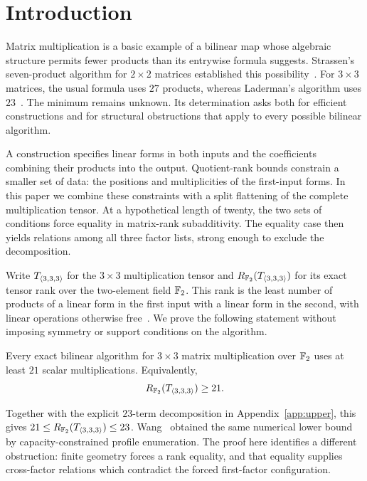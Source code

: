 \section{Introduction}\label{sec:introduction}

Matrix multiplication is a basic example of a bilinear map whose
algebraic structure permits fewer products than its entrywise formula
suggests. Strassen's seven-product algorithm for $2\times2$ matrices
established this possibility~\cite{strassen}. For $3\times3$ matrices,
the usual formula uses $27$ products, whereas Laderman's algorithm uses
$23$~\cite{laderman}. The minimum remains unknown. Its determination
asks both for efficient constructions and for structural obstructions
that apply to every possible bilinear algorithm.

A construction specifies linear forms in both inputs and the
coefficients combining their products into the output. Quotient-rank
bounds constrain a smaller set of data: the positions and
multiplicities of the first-input forms. In this paper we combine
these constraints with a split flattening of the complete
multiplication tensor. At a hypothetical length of twenty, the two
sets of conditions force equality in matrix-rank subadditivity.
The equality case then yields relations among all three factor lists,
strong enough to exclude the decomposition.

Write $T_{\langle3,3,3\rangle}$ for the $3\times3$ multiplication tensor and
$R_{\mathbb F_2}(T_{\langle3,3,3\rangle})$ for its exact tensor rank over the two-element field $\mathbb F_2$.
This rank is the least number of products of a linear form in the first
input with a linear form in the second, with linear operations otherwise
free~\cite{bcs}. We prove the following statement without imposing symmetry or
support conditions on the algorithm.

\begin{theorem}\label{thm:main}
Every exact bilinear algorithm for $3\times3$ matrix multiplication over
$\mathbb F_2$ uses at least $21$ scalar multiplications. Equivalently,
\begin{equation}\label{eq:main-bound}
 R_{\mathbb F_2}(T_{\langle3,3,3\rangle})\geq21.
\end{equation}
\end{theorem}

Together with the explicit $23$-term decomposition in
Appendix~\ref{app:upper}, this gives
$21\leq R_{\mathbb F_2}(T_{\langle3,3,3\rangle})\leq23$.
Wang~\cite{wang21} obtained the same numerical lower bound by
capacity-constrained profile enumeration. The proof here identifies a
different obstruction: finite geometry forces a rank equality, and
that equality supplies cross-factor relations which contradict the
forced first-factor configuration.

